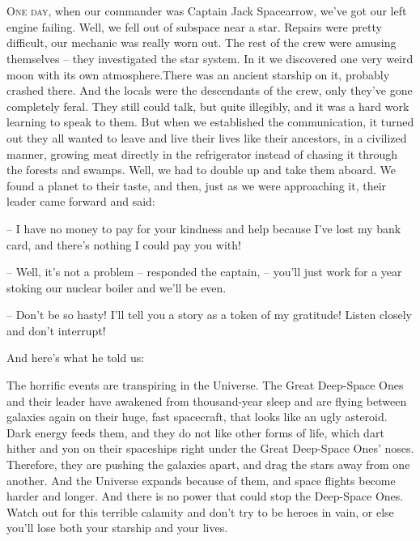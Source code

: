 \documentclass[ebook,oneside,final,openright]{memoir}
\begin{document}
\chapter{}
\par
\lettrine{O}{ne day,} when our commander was Captain Jack Spacearrow, we’ve got our left engine failing. Well, we fell out of subspace near a star. Repairs were pretty difficult, our mechanic was really worn out. The rest of the crew were amusing themselves – they investigated the star system. In it we discovered one very weird moon with its own atmosphere.There was an ancient starship on it, probably crashed there. And the locals were the descendants of the crew, only they’ve gone completely feral. They still could talk, but quite illegibly, and it was a hard work learning to speak to them. But when we established the communication, it turned out they all wanted to leave and live their lives like their ancestors, in a civilized manner, growing meat directly in the refrigerator instead of chasing it through the forests and swamps. Well, we had to double up and take them aboard. We found a planet to their taste, and then, just as we were approaching it, their leader came forward and said: \par
\par
– I have no money to pay for your kindness and help because I’ve lost my bank card, and there’s nothing I could pay you with!\par
– Well, it’s not a problem – responded the captain, – you’ll just work for a year stoking our nuclear boiler and we’ll be even. \par
– Don’t be so hasty! I’ll tell you a story as a token of my gratitude! Listen closely and don’t interrupt! \par
 And here’s what he told us:\par
\par
The horrific events are transpiring in the Universe. The Great Deep-Space Ones and their leader have awakened from thousand-year sleep and are flying between galaxies again on their huge, fast spacecraft, that looks like an ugly asteroid. Dark energy feeds them, and they do not like other forms of life, which dart hither and yon on their spaceships right under the Great Deep-Space Ones’ noses. Therefore, they are pushing the galaxies apart, and drag the stars away from one another. And the Universe expands because of them, and space flights become harder and longer. And there is no power that could stop the Deep-Space Ones. Watch out for this terrible calamity and don’t try to be heroes in vain, or else you’ll lose both your starship and your lives.\par
\end{document}
